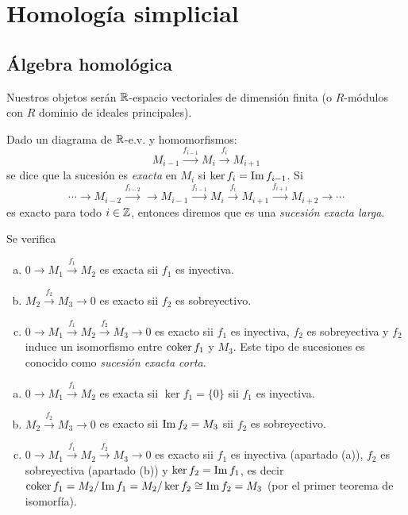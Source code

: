 \documentclass[HS.tex]{subfiles}
\begin{document}
\chapter{Homología simplicial}
\section{Álgebra homológica}
Nuestros objetos serán $\mathbb{R}$-espacio vectoriales de dimensión finita (o $R$-módulos con $R$ dominio de ideales principales).

\begin{defi}
Dado un diagrama de $\mathbb{R}$-e.v. y homomorfismos:
\[ M_{i-1} \xrightarrow{f_{i-1}} M_i \xrightarrow{f_i} M_{i+1} \]
se dice que la sucesión es \emph{exacta} en $M_i$ si $\ker f_i = \operatorname{Im} f_{i-1}$. Si
\[ \cdots \rightarrow M_{i-2} \xrightarrow{f_{i-2}} \rightarrow M_{i-1} \xrightarrow{f_{i-1}} M_i \xrightarrow{f_i} M_{i+1} \xrightarrow{f_{i+1}} M_{i+2} \rightarrow \cdots \]
es exacto para todo $i \in \mathbb{Z}$, entonces diremos que es una \emph{sucesión exacta larga}.
\end{defi}

\begin{lemma}
Se verifica
\begin{enumerate}[a)]
\item $0 \rightarrow M_1 \xrightarrow{f_1} M_2$ es exacta sii $f_1$ es inyectiva.
\item $M_2 \xrightarrow{f_2} M_3 \rightarrow 0$ es exacto sii $f_2$ es sobreyectivo.
\item $0 \rightarrow M_1 \xrightarrow{f_1} M_2 \xrightarrow{f_2} M_3 \rightarrow 0$ es exacto sii $f_1$ es inyectiva, $f_2$ es sobreyectiva y $f_2$ induce un isomorfismo entre $\operatorname{coker} f_1$ y $M_3$. Este tipo de sucesiones es conocido como \emph{sucesión exacta corta}.
\end{enumerate}
\end{lemma}
\begin{dem}
\begin{enumerate}[a)]
\item $0 \rightarrow M_1 \xrightarrow{f_1} M_2$ es exacta sii $\ker f_1 = \{0\}$ sii $f_1$ es inyectiva.
\item $M_2 \xrightarrow{f_2} M_3 \rightarrow 0$ es exacto sii $\operatorname{Im} f_2 = M_3$ sii $f_2$ es sobreyectivo.
\item $0 \rightarrow M_1 \xrightarrow{f_1} M_2 \xrightarrow{f_2} M_3 \rightarrow 0$ es exacto sii $f_1$ es inyectiva (apartado (a)), $f_2$ es sobreyectiva (apartado (b)) y $\ker f_2 = \operatorname{Im} f_1$, es decir $\operatorname{coker} f_1 = M_2/\operatorname{Im} f_1 = M_2/\ker f_2 \cong \operatorname{Im} f_2 = M_3$ (por el primer teorema de isomorfía).
\end{enumerate}
\end{dem}
\end{document}
